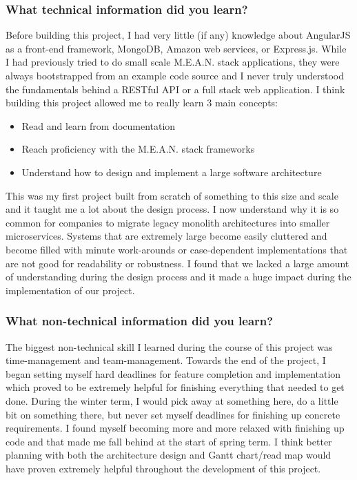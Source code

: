 \documentclass[journal,10pt,onecolumn,compsoc]{IEEEtran}
\begin{document}
    \subsubsection{What technical information did you learn?}    
    Before building this project, I had very little (if any) knowledge about AngularJS as a front-end framework, MongoDB, Amazon web services, or Express.js. While I had previously tried to do small scale M.E.A.N. stack applications, they were always bootstrapped from an example code source and I never truly understood the fundamentals behind a RESTful API or a full stack web application. I think building this project allowed me to really learn 3 main concepts:
    \begin{itemize}
        \item Read and learn from documentation
        \item Reach proficiency with the M.E.A.N. stack frameworks
        \item Understand how to design and implement a large software architecture
    \end{itemize}
    This was my first project built from scratch of something to this size and scale and it taught me a lot about the design process. I now understand why it is so common for companies to migrate legacy monolith architectures into smaller microservices. Systems that are extremely large become easily cluttered and become filled with minute work-arounds or case-dependent implementations that are not good for readability or robustness. I found that we lacked a large amount of understanding during the design process and it made a huge impact during the implementation of our project.
    \subsubsection{What non-technical information did you learn?}
    The biggest non-technical skill I learned during the course of this project was time-management and team-management. Towards the end of the project, I began setting myself hard deadlines for feature completion and implementation which proved to be extremely helpful for finishing everything that needed to get done. During the winter term, I would pick away at something here, do a little bit on something there, but never set myself deadlines for finishing up concrete requirements. I found myself becoming more and more relaxed with finishing up code and that made me fall behind at the start of spring term. I think better planning with both the architecture design and Gantt chart/read map would have proven extremely helpful throughout the development of this project.
\end{document}
